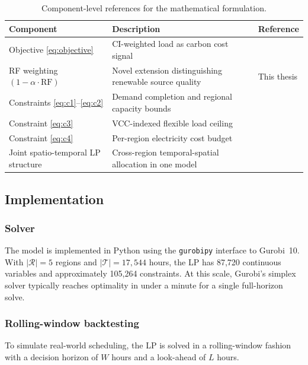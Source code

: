 \begin{table}[h]
\centering
\begin{tabular}{lp{7cm}l}
\toprule
\textbf{Component} & \textbf{Description} & \textbf{Reference} \\
\midrule
Objective \eqref{eq:objective}
  & CI-weighted load as carbon cost signal
  & \citet{radovanovic2023} \\
RF weighting $(1-\alpha\cdot\mathrm{RF})$
  & Novel extension distinguishing renewable source quality
  & This thesis \\
Constraints \eqref{eq:c1}--\eqref{eq:c2}
  & Demand completion and regional capacity bounds
  & \citet{liu2012} \\
Constraint \eqref{eq:c3}
  & VCC-indexed flexible load ceiling
  & \citet{colangelo2025} \\
Constraint \eqref{eq:c4}
  & Per-region electricity cost budget
  & \citet{hao2024joint} \\
Joint spatio-temporal LP structure
  & Cross-region temporal-spatial allocation in one model
  & \citet{riepin2024spatiotemporal, attenni2024shifting} \\
\bottomrule
\end{tabular}
\caption{Component-level references for the mathematical formulation.}
\label{tab:modelrefs}
\end{table}

\subsection{Implementation}

\subsubsection*{Solver}
The model is implemented in Python using the \texttt{gurobipy} interface to Gurobi~10.
With $|\mathcal{R}| = 5$ regions and $|\mathcal{T}| = 17{,}544$ hours, the LP has 87,720 continuous variables and approximately 105,264 constraints.
At this scale, Gurobi's simplex solver typically reaches optimality in under a minute for a single full-horizon solve.

\subsubsection*{Rolling-window backtesting}
To simulate real-world scheduling, the LP is solved in a rolling-window fashion with a decision horizon of $W$ hours and a look-ahead of $L$ hours.

